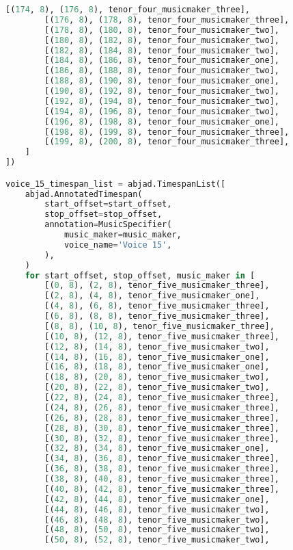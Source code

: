 \begin{lstlisting}[language=Python, caption=Invocation Source Code]
        [(174, 8), (176, 8), tenor_four_musicmaker_three],
        [(176, 8), (178, 8), tenor_four_musicmaker_three],
        [(178, 8), (180, 8), tenor_four_musicmaker_two],
        [(180, 8), (182, 8), tenor_four_musicmaker_two],
        [(182, 8), (184, 8), tenor_four_musicmaker_two],
        [(184, 8), (186, 8), tenor_four_musicmaker_one],
        [(186, 8), (188, 8), tenor_four_musicmaker_two],
        [(188, 8), (190, 8), tenor_four_musicmaker_one],
        [(190, 8), (192, 8), tenor_four_musicmaker_two],
        [(192, 8), (194, 8), tenor_four_musicmaker_two],
        [(194, 8), (196, 8), tenor_four_musicmaker_two],
        [(196, 8), (198, 8), tenor_four_musicmaker_one],
        [(198, 8), (199, 8), tenor_four_musicmaker_three],
        [(199, 8), (200, 8), tenor_four_musicmaker_three],
    ]
])

voice_15_timespan_list = abjad.TimespanList([
    abjad.AnnotatedTimespan(
        start_offset=start_offset,
        stop_offset=stop_offset,
        annotation=MusicSpecifier(
            music_maker=music_maker,
            voice_name='Voice 15',
        ),
    )
    for start_offset, stop_offset, music_maker in [
        [(0, 8), (2, 8), tenor_five_musicmaker_three],
        [(2, 8), (4, 8), tenor_five_musicmaker_one],
        [(4, 8), (6, 8), tenor_five_musicmaker_three],
        [(6, 8), (8, 8), tenor_five_musicmaker_three],
        [(8, 8), (10, 8), tenor_five_musicmaker_three],
        [(10, 8), (12, 8), tenor_five_musicmaker_three],
        [(12, 8), (14, 8), tenor_five_musicmaker_two],
        [(14, 8), (16, 8), tenor_five_musicmaker_one],
        [(16, 8), (18, 8), tenor_five_musicmaker_one],
        [(18, 8), (20, 8), tenor_five_musicmaker_two],
        [(20, 8), (22, 8), tenor_five_musicmaker_two],
        [(22, 8), (24, 8), tenor_five_musicmaker_three],
        [(24, 8), (26, 8), tenor_five_musicmaker_three],
        [(26, 8), (28, 8), tenor_five_musicmaker_three],
        [(28, 8), (30, 8), tenor_five_musicmaker_three],
        [(30, 8), (32, 8), tenor_five_musicmaker_three],
        [(32, 8), (34, 8), tenor_five_musicmaker_one],
        [(34, 8), (36, 8), tenor_five_musicmaker_three],
        [(36, 8), (38, 8), tenor_five_musicmaker_three],
        [(38, 8), (40, 8), tenor_five_musicmaker_three],
        [(40, 8), (42, 8), tenor_five_musicmaker_three],
        [(42, 8), (44, 8), tenor_five_musicmaker_one],
        [(44, 8), (46, 8), tenor_five_musicmaker_two],
        [(46, 8), (48, 8), tenor_five_musicmaker_two],
        [(48, 8), (50, 8), tenor_five_musicmaker_two],
        [(50, 8), (52, 8), tenor_five_musicmaker_two],

\end{lstlisting}
